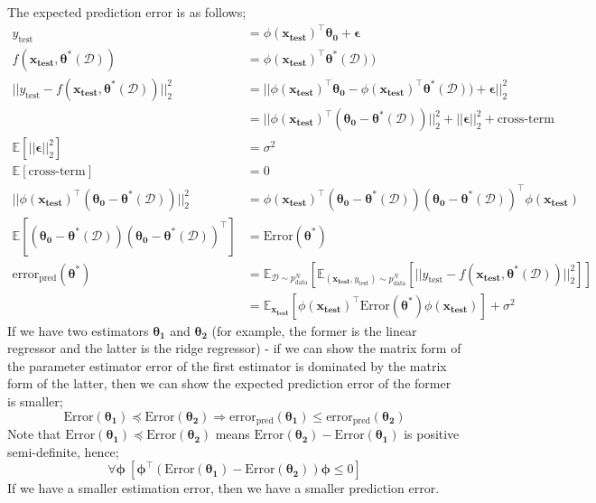 \documentclass[a4paper, 12pt]{article}
\newcommand{\mat}[1]{\boldsymbol{#1}}
\renewcommand{\vec}[1]{\boldsymbol{#1}}
\begin{document}
                The expected prediction error is as follows;
                \begin{align*}
                    y_\text{test} & = \phi(\vec{x_\text{test}})^\top\mat{\theta_0} + \mat{\epsilon} \\
                    f(\vec{x_\text{test}}, \mat{\theta^*}(\mathcal{D})) & = \phi(\vec{x_\text{test}})^\top\mat{\theta^*}(\mathcal{D})) \\
                    || y_\text{test} - f(\vec{x_\text{test}}, \mat{\theta^*}(\mathcal{D})) ||_2^2 & = || \phi(\vec{x_\text{test}})^\top\mat{\theta_0} - \phi(\vec{x_\text{test}})^\top\mat{\theta^*}(\mathcal{D})) + \mat{\epsilon} ||_2^2 \\
                    & = || \phi(\vec{x_\text{test}})^\top (\mat{\theta_0} - \mat{\theta^*}(\mathcal{D})) ||_2^2 + || \mat{\epsilon} ||_2^2 + \text{cross-term} \\
                    \mathbb{E}[|| \mat{\epsilon} ||_2^2] & = \sigma^2 \\
                    \mathbb{E}[\text{cross-term}] & = 0 \\
                    || \phi(\vec{x_\text{test}})^\top (\mat{\theta_0} - \mat{\theta^*}(\mathcal{D})) ||_2^2 & = \phi(\vec{x_\text{test}})^\top (\mat{\theta_0} - \mat{\theta^*}(\mathcal{D})) (\mat{\theta_0} - \mat{\theta^*}(\mathcal{D}))^\top \phi(\vec{x_\text{test}}) \\
                    \mathbb{E}[(\mat{\theta_0} - \mat{\theta^*}(\mathcal{D})) (\mat{\theta_0} - \mat{\theta^*}(\mathcal{D}))^\top] & = \text{Error}(\mat{\theta^*}) \\
                    \mathrm{error}_\text{pred}(\mat{\theta^*}) & = \mathbb{E}_{\mathcal{D} \sim p_\text{data}^N}[\mathbb{E}_{(\vec{x_\text{test}}, y_\text{test}) \sim p_\text{data}^N}[|| y_\text{test} - f(\vec{x_\text{test}}, \mat{\theta^*}(\mathcal{D})) ||_2^2]] \\
                    & = \mathbb{E}_{\vec{x_\text{test}}} [\phi(\vec{x_\text{test}})^\top\mathrm{Error}(\mat{\theta^*})\phi(\vec{x_\text{test}})] + \sigma^2
                \end{align*}
                If we have two estimators $\mat{\theta_1}$ and $\mat{\theta_2}$ (for example, the former is the linear regressor and the latter is the ridge regressor) - if we can show the matrix form of the parameter estimator error of the first estimator is dominated by the matrix form of the latter, then we can show the expected prediction error of the former is smaller;
                $$\mathrm{Error}(\mat{\theta_1}) \preceq \mathrm{Error}(\mat{\theta_2}) \Rightarrow \mathrm{error}_\text{pred}(\mat{\theta_1}) \leq \mathrm{error}_\text{pred}(\mat{\theta_2})$$
                Note that $\mathrm{Error}(\mat{\theta_1}) \preceq \mathrm{Error}(\mat{\theta_2})$ means $\mathrm{Error}(\mat{\theta_2}) - \mathrm{Error}(\mat{\theta_1})$ is positive semi-definite, hence;
                $$\forall \vec{\phi}\ [\vec{\phi}^\top (\mathrm{Error}(\mat{\theta_1}) - \mathrm{Error}(\mat{\theta_2})) \vec{\phi} \leq 0]$$
                If we have a smaller estimation error, then we have a smaller prediction error.
                \medskip
\end{document}
